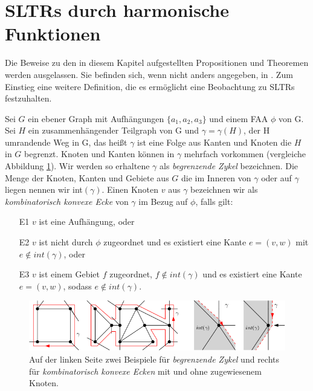 \section{SLTRs durch harmonische Funktionen}\label{harmonic_approach}

Die Beweise zu den in diesem Kapitel aufgestellten Propositionen und Theoremen werden ausgelassen. Sie befinden sich, wenn nicht anders angegeben, in \cite{af13} . Zum Einstieg eine weitere Definition, die es ermöglicht eine Beobachtung zu SLTRs festzuhalten.

\begin{definition}\label{def_ccc}
Sei $G$ ein ebener Graph mit Aufhängungen $\{a_1,a_2,a_3\}$ und einem FAA $\phi$ von G. Sei $H$ ein zusammenhängender Teilgraph von G und $\gamma=\gamma(H)$, der H umrandende Weg in G, das heißt $\gamma$ ist eine Folge aus Kanten und Knoten die $H$ in $G$ begrenzt. Knoten und Kanten können in $\gamma$ mehrfach vorkommen (vergleiche Abbildung \ref{corner_def}). Wir werden so erhaltene $\gamma$ als \textit{begrenzende Zykel} bezeichnen. Die Menge der Knoten, Kanten und Gebiete aus $G$ die im Inneren von $\gamma$ oder auf $\gamma$ liegen nennen wir int$(\gamma)$. Einen Knoten $v$ aus $\gamma$ bezeichnen wir als \textit{kombinatorisch konvexe Ecke} von $\gamma$ im Bezug auf $\phi$, falls gilt:
\begin{itemize}
\item [E1] $v$ ist eine Aufhängung, oder
\item [E2] $v$ ist nicht durch $\phi$ zugeordnet und es existiert eine Kante $e = (v,w)$ mit $e \notin int(\gamma)$, oder
\item [E3] $v$ ist einem Gebiet $f$ zugeordnet, $f \notin int(\gamma)$ und es existiert eine Kante $e = (v,w)$, sodass $e \notin int(\gamma)$.
\end{itemize}
\end{definition}

\begin{figure}[h]
	\centering
  \includegraphics[width=1\textwidth]{corner_def.png}
  \caption{Auf der linken Seite zwei Beispiele für \textit{begrenzende Zykel} und rechts für \textit{kombinatorisch konvexe Ecken} mit und ohne zugewiesenem Knoten.}
  \label{corner_def}
\end{figure}

